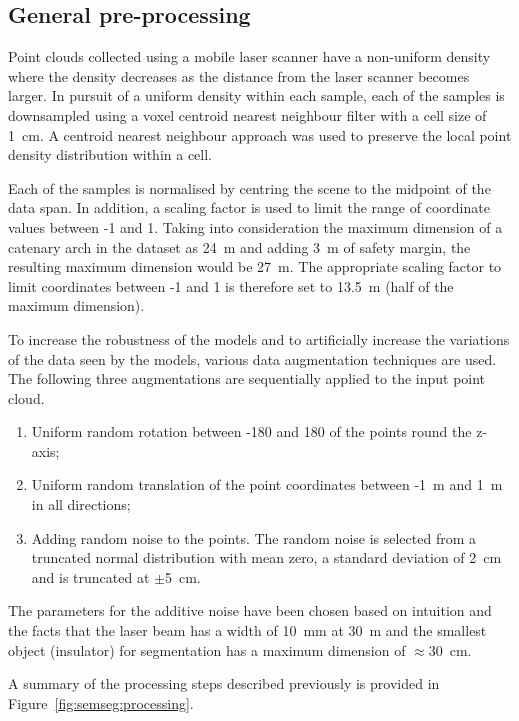 \subsection{General pre-processing}
Point clouds collected using a mobile laser scanner have a non-uniform density where the density decreases as the distance from the laser scanner becomes larger. In pursuit of a uniform density within each sample, each of the samples is downsampled using a voxel centroid nearest neighbour filter with a cell size of 1~cm. A centroid nearest neighbour approach was used to preserve the local point density distribution within a cell.

Each of the samples is normalised by centring the scene to the midpoint of the data span. In addition, a scaling factor is used to limit the range of coordinate values between -1 and 1. Taking into consideration the maximum dimension of a catenary arch in the dataset as 24~m and adding 3~m of safety margin, the resulting maximum dimension would be 27~m. The appropriate scaling factor to limit coordinates between -1 and 1 is therefore set to 13.5~m (half of the maximum dimension).

To increase the robustness of the models and to artificially increase the variations of the data seen by the models, various data augmentation techniques are used. The following three augmentations are sequentially applied to the input point cloud.

\begin{enumerate}
    \item Uniform random rotation between -180\textdegree{} and 180\textdegree{} of the points round the z-axis;
    \item Uniform random translation of the point coordinates between -1~m and 1~m in all directions;
    \item Adding random noise to the points. The random noise is selected from a truncated normal distribution with mean zero, a standard deviation of 2~cm and is truncated at \(\pm\)5~cm.
\end{enumerate}
The parameters for the additive noise have been chosen based on intuition and the facts that the laser beam has a width of 10~mm at 30~m and the smallest object (insulator) for segmentation has a maximum dimension of \(\approx\)30~cm.

\noindent A summary of the processing steps described previously is provided in Figure~\ref{fig:semseg:processing}.

